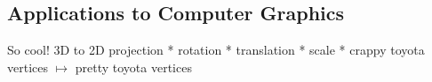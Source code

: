 \begin{card}
    \subsection{Applications to Computer Graphics}
    So cool!
    3D to 2D projection * rotation * translation * scale * crappy toyota vertices $\mapsto$ pretty toyota vertices

\end{card}


